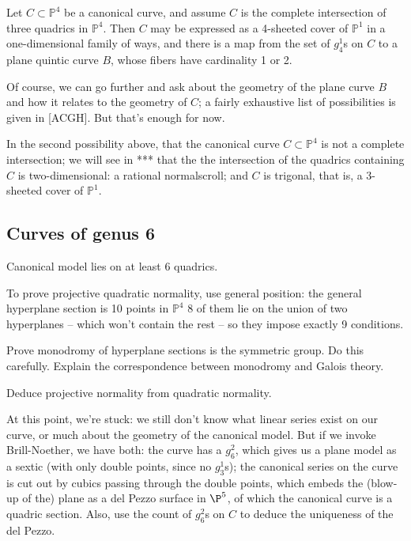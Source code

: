 \documentclass[12pt, leqno]{article}
\def\PP{{\mathbb P}}
\begin{document}
\begin{proposition}
Let $C \subset \PP^4$ be a canonical curve, and assume $C$ is the complete intersection of three quadrics in $\PP^4$. Then $C$ may be expressed as a 4-sheeted cover of $\PP^1$ in a one-dimensional family of ways, and there is a map from the set of $g^1_4$s on $C$ to a plane quintic curve $B$, whose fibers have cardinality 1 or 2.
\end{proposition}

Of course, we can go further and ask about the geometry of the plane curve $B$ and how it relates to the geometry of $C$; a fairly exhaustive list of possibilities is given in \cite{****} [ACGH]. But that's enough for now.

In the second possibility above, that the canonical curve $C \subset \PP^4$ is not a complete intersection; we will see in *** that the
 the intersection of the quadrics containing $C$ is two-dimensional: a rational normalscroll;  and  $C$ is trigonal, that is, a 3-sheeted cover of $\PP^1$. 

\subsection{Curves of genus 6}
Canonical model lies on at least 6 quadrics. 

To prove projective quadratic normality,  use general position: the general hyperplane section is 10 points in $\PP^4$ 8 of them lie on the union of two hyperplanes -- which won't contain the rest -- so they impose exactly 9 conditions. 

Prove monodromy of hyperplane sections is the symmetric group. Do this carefully. Explain the correspondence between monodromy and Galois theory. 

Deduce projective normality from quadratic normality.

At this point, we're stuck: we still don't know what linear series exist on our curve, or much about the geometry of the canonical model. But if we invoke Brill-Noether, we have both: the curve has a $g^2_6$, which gives us a plane model as a sextic (with only double points, since no $g^1_3$s); the canonical series on the curve is cut out by cubics passing through the double points, which embeds the (blow-up of the) plane as a del Pezzo surface in $\P^5$, of which the canonical curve is a quadric section. Also, use the count of $g^2_6$s on $C$ to deduce the uniqueness of the del Pezzo.
\end{document}
